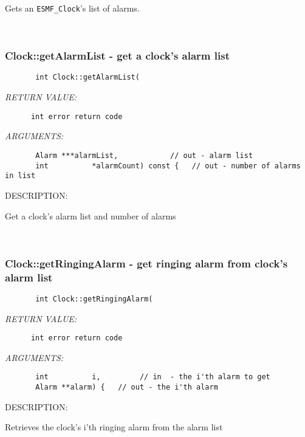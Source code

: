       Gets an {\tt ESMF\_Clock}'s list of alarms.
   
 
\mbox{}\hrulefill\ 
 
\subsubsection [Clock::getAlarmList] {Clock::getAlarmList - get a clock's alarm list}


  
\begin{verbatim}       int Clock::getAlarmList(\end{verbatim}{\em RETURN VALUE:}
\begin{verbatim}      int error return code\end{verbatim}{\em ARGUMENTS:}
\begin{verbatim}       Alarm ***alarmList,            // out - alarm list
       int          *alarmCount) const {   // out - number of alarms in list\end{verbatim}
{\sf DESCRIPTION:\\ }


       Get a clock's alarm list and number of alarms
   
 
\mbox{}\hrulefill\ 
 
\subsubsection [Clock::getRingingAlarm] {Clock::getRingingAlarm - get ringing alarm from clock's alarm list}


  
\begin{verbatim}       int Clock::getRingingAlarm(\end{verbatim}{\em RETURN VALUE:}
\begin{verbatim}      int error return code\end{verbatim}{\em ARGUMENTS:}
\begin{verbatim}       int          i,         // in  - the i'th alarm to get
       Alarm **alarm) {   // out - the i'th alarm\end{verbatim}
{\sf DESCRIPTION:\\ }


       Retrieves the clock's i'th ringing alarm from the alarm list
   
